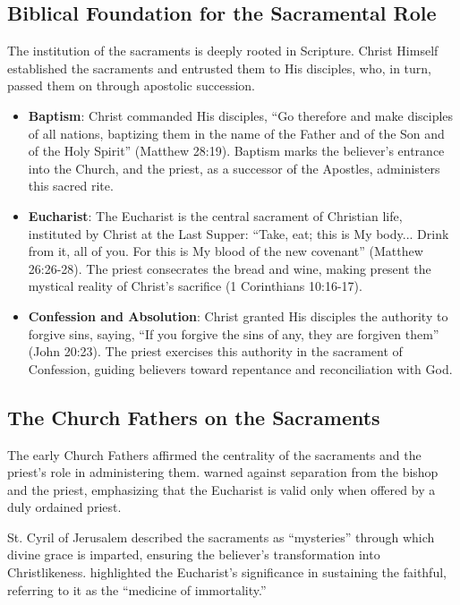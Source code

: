 \documentclass[12pt, doc]{apa7}   	%
\begin{document}
\subsection{Biblical Foundation for the Sacramental Role}

The institution of the sacraments is deeply rooted in Scripture. Christ Himself established the sacraments and entrusted them to His disciples, who, in turn, passed them on through apostolic succession. 

\begin{itemize}
    \item \textbf{Baptism}: Christ commanded His disciples, ``Go therefore and make disciples of all nations, baptizing them in the name of the Father and of the Son and of the Holy Spirit'' (Matthew 28:19). Baptism marks the believer’s entrance into the Church, and the priest, as a successor of the Apostles, administers this sacred rite.
    
    \item \textbf{Eucharist}: The Eucharist is the central sacrament of Christian life, instituted by Christ at the Last Supper: ``Take, eat; this is My body... Drink from it, all of you. For this is My blood of the new covenant'' (Matthew 26:26-28). The priest consecrates the bread and wine, making present the mystical reality of Christ’s sacrifice (1 Corinthians 10:16-17).

    \item \textbf{Confession and Absolution}: Christ granted His disciples the authority to forgive sins, saying, ``If you forgive the sins of any, they are forgiven them'' (John 20:23). The priest exercises this authority in the sacrament of Confession, guiding believers toward repentance and reconciliation with God.
\end{itemize}

\subsection{The Church Fathers on the Sacraments}

The early Church Fathers affirmed the centrality of the sacraments and the priest’s role in administering them. \cite{epistles_ignatius} warned against separation from the bishop and the priest, emphasizing that the Eucharist is valid only when offered by a duly ordained priest. 

St. Cyril of Jerusalem \citep{early_church_akin} described the sacraments as ``mysteries'' through which divine grace is imparted, ensuring the believer’s transformation into Christlikeness. \citet{priesthood_chrysostom,complete_work_chrysostom} highlighted the Eucharist’s significance in sustaining the faithful, referring to it as the ``medicine of immortality.''
\end{document}
